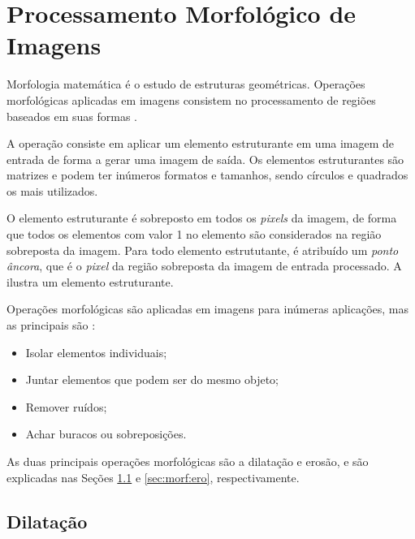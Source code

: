 \section{Processamento Morfológico de Imagens}\label{sec:morf}

\par Morfologia matemática é o estudo de estruturas geométricas. Operações morfológicas aplicadas em imagens consistem no processamento de regiões baseados em suas formas \cite{gonsalez2006}. 

\par A operação consiste em aplicar um elemento estruturante em uma imagem de entrada de forma a gerar uma imagem de saída. Os elementos estruturantes são matrizes e podem ter inúmeros formatos e tamanhos, sendo círculos e quadrados os mais utilizados.

\par O elemento estruturante é sobreposto em todos os \textit{pixels} da imagem, de forma que todos os elementos com valor 1 no elemento são considerados na região sobreposta da imagem. Para todo elemento estrututante, é atribuído um \textit{ponto âncora}, que é o \textit{pixel} da região sobreposta da imagem de entrada processado. A  ilustra um elemento estruturante.


\par Operações morfológicas são aplicadas em imagens para inúmeras aplicações, mas as principais são \cite{erosionDilationOpencv}:

\begin{itemize}
    \item Isolar elementos individuais;
    \item Juntar elementos que podem ser do mesmo objeto;
    \item Remover ruídos;
    \item Achar buracos ou sobreposições.
\end{itemize}

\par As duas principais operações morfológicas são a dilatação e erosão, e são explicadas nas Seções \ref{sec:morf:dil} e \ref{sec:morf:ero}, respectivamente.

\subsection{Dilatação} \label{sec:morf:dil}

